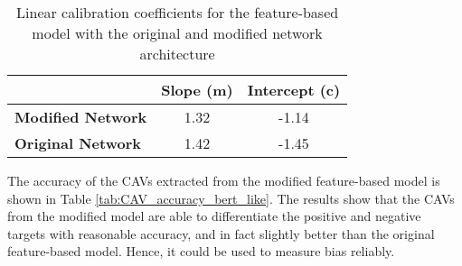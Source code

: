 \begin{table}[H]
    \centering
    \begin{tabular}{|l|c|c|}
        \hline
        \textbf{}                 & \textbf{Slope (m)} & \textbf{Intercept (c)} \\ \hline
        \textbf{Modified Network} & 1.32               & -1.14                  \\ \hline
        \textbf{Original Network} & 1.42               & -1.45                  \\ \hline
    \end{tabular}
    \caption{Linear calibration coefficients for the feature-based model with the original and modified network architecture}
    \label{tab:linear_regression_coefficients_bert_like}
\end{table}

The accuracy of the CAVs extracted from the modified feature-based model is shown in Table \ref{tab:CAV_accuracy_bert_like}. The results show that the CAVs from the modified model are able to differentiate the positive and negative targets with reasonable accuracy, and in fact slightly better than the original feature-based model. Hence, it could be used to measure bias reliably.

